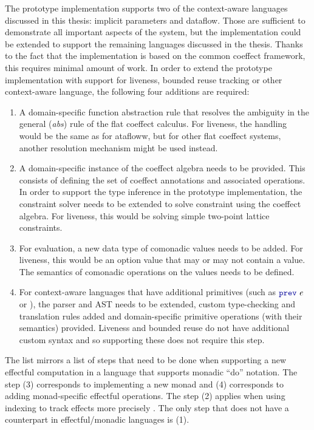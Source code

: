 The prototype implementation supports two of the context-aware languages discussed in this thesis:
implicit parameters and dataflow. Those are sufficient to demonstrate all important aspects of the
system, but the implementation could be extended to support the remaining languages discussed in
the thesis. Thanks to the fact that the implementation is based on the common coeffect framework,
this requires minimal amount of work. In order to extend the prototype implementation with support
for liveness, bounded reuse tracking or other context-aware language, the following four additions
are required:

\begin{enumerate}
\item A domain-specific function abstraction rule that resolves the ambiguity in the general
  (\emph{abs}) rule of the flat coeffect calculus. For liveness, the handling would be the same
  as for atafloww, but for other flat coeffect systems, another resolution mechanism might be used
  instead.

\item A domain-specific instance of the coeffect algebra needs to be provided. This consists of
  defining the set of coeffect annotations and associated operations. In order to support
  the type inference in the prototype implementation, the constraint solver needs to be extended
  to solve constraint using the coeffect algebra. For liveness, this would be solving simple
  two-point lattice constraints.

\item For evaluation, a new data type of comonadic values needs to be added. For liveness, this would
  be an option value that may or may not contain a value. The semantics of comonadic operations on the
  values needs to be defined.

\item For context-aware languages that have additional primitives (such as $\kvd{prev}~e$ or ),
  the parser and AST needs to be extended, custom type-checking and translation rules added and
  domain-specific primitive operations (with their semantics) provided. Liveness and bounded reuse
  do not have additional custom syntax and so supporting these does not require this step.
\end{enumerate}

\noindent
The list mirrors a list of steps that need to be done when supporting a new effectful computation
in a language that supports monadic ``do'' notation. The step (3) corresponds to implementing a new
monad and (4) corresponds to adding monad-specific effectful operations. The step (2) applies when
using indexing to track effects more precisely \cite{effects-embedding}. The only step that does not
have a counterpart in effectful/monadic languages is (1).


